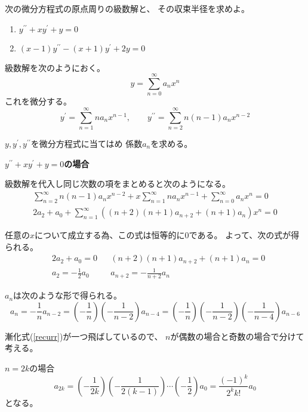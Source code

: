 \documentclass[12pt,b5paper]{ltjsarticle}
\begin{document}
次の微分方程式の原点周りの級数解と、
その収束半径を求めよ。
\begin{enumerate}
 \item $y^{\prime\prime} + xy^{\prime} +y =0$
 \item $(x-1)y^{\prime\prime} - (x+1) y^{\prime} + 2y =0$
\end{enumerate}

\dotfill

級数解を次のようにおく。
\begin{equation}
 y=\sum_{n=0}^{\infty}a_n x^n
\end{equation}
これを微分する。
\begin{equation}
 y^{\prime}=\sum_{n=1}^{\infty}na_n x^{n-1}
  ,\qquad
 y^{\prime\prime}=\sum_{n=2}^{\infty}n(n-1)a_n x^{n-2}
\end{equation}

$y,y^{\prime},y^{\prime\prime}$を微分方程式に当てはめ
係数$a_n$を求める。

\dotfill
\textbf{$y^{\prime\prime} + xy^{\prime} +y =0$の場合}
\dotfill


級数解を代入し同じ次数の項をまとめると次のようになる。
\begin{gather}
 \sum_{n=2}^{\infty}n(n-1)a_n x^{n-2}
 +
 x\sum_{n=1}^{\infty}na_n x^{n-1}
 +
 \sum_{n=0}^{\infty}a_n x^n
 =0\\
 2a_2+a_0
 +
 \sum_{n=1}^{\infty}( (n+2)(n+1)a_{n+2} + (n+1)a_n  )x^{n}
 =0
\end{gather}

任意の$x$について成立する為、この式は恒等的に$0$である。
よって、次の式が得られる。
\begin{align}
 & 2a_2+a_0 = 0
 &
 &(n+2)(n+1)a_{n+2} + (n+1)a_n = 0\\
 & a_2 = -\frac{1}{2}a_0
 &
 &a_{n+2} = -\frac{1}{n+2}a_n
 \label{recurr}
\end{align}

$a_n$は次のような形で得られる。
\begin{equation}
 a_{n} = -\frac{1}{n}a_{n-2} = \left(-\frac{1}{n}\right)\left(-\frac{1}{n-2}\right)a_{n-4}
  = \left(-\frac{1}{n}\right)\left(-\frac{1}{n-2}\right)\left(-\frac{1}{n-4}\right)a_{n-6}
\end{equation}

漸化式(\ref{recurr})が一つ飛ばしているので、
$n$が偶数の場合と奇数の場合で分けて考える。

$n=2k$の場合
\begin{equation}
 a_{2k} = \left(-\frac{1}{2k}\right)\left(-\frac{1}{2(k-1)}\right)\cdots\left(-\frac{1}{2}\right)a_{0}
  =\frac{(-1)^k}{2^k k!}a_0
\end{equation}
となる。
\end{document}
